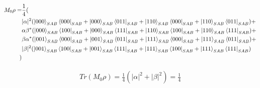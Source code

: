 \documentclass[12pt]{article}
\begin{document}
\begin{enumerate}

          \begin{align*}
              M_0\rho = & \frac{1}{4}(                                                                                                                                 \\
                        & |\alpha|^2(\ket{000}_{SAB}\bra{000}_{SAB}+\ket{000}_{SAB}\bra{011}_{SAB}+\ket{110}_{SAB}\bra{000}_{SAB}+\ket{110}_{SAB}\bra{011}_{SAB} )+    \\
                        & \alpha\beta^*(\ket{000}_{SAB}\bra{100}_{SAB}+\ket{000}_{SAB}\bra{111}_{SAB}+\ket{110}_{SAB}\bra{100}_{SAB}+\ket{110}_{SAB}\bra{111}_{SAB} )+ \\
                        & \beta\alpha^*(\ket{001}_{SAB}\bra{000}_{SAB}+\ket{001}_{SAB}\bra{011}_{SAB}+\ket{111}_{SAB}\bra{000}_{SAB}+\ket{111}_{SAB}\bra{011}_{SAB} )+ \\
                        & |\beta|^2(\ket{001}_{SAB}\bra{100}_{SAB}+\ket{001}_{SAB}\bra{111}_{SAB}+\ket{111}_{SAB}\bra{100}_{SAB}+\ket{111}_{SAB}\bra{111}_{SAB} )      \\
              )
          \end{align*}

          \begin{align*}
              Tr(M_0\rho) = \frac{1}{4}(|\alpha|^2+|\beta|^2) = \frac{1}{4}
          \end{align*}




\end{enumerate}
\end{document}
